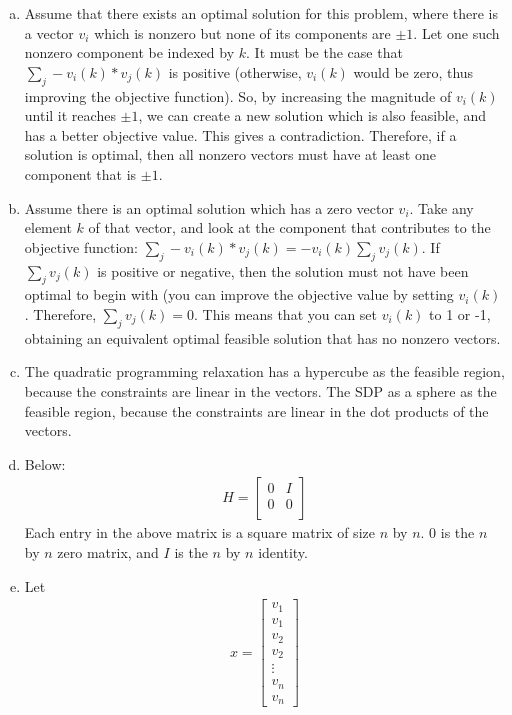 \documentclass[fleqn]{homework}
\begin{document}
\begin{problem}{3}
    \begin{enumerate}[a.]
    \item Assume that there exists an optimal solution for this problem, where
      there is a vector $v_i$ which is nonzero but none of its components are
      $\pm 1$.  Let one such nonzero component be indexed by $k$.  It must be
      the case that $\sum_{j} -v_i(k) * v_j(k)$ is positive (otherwise,
      $v_{i}(k)$ would be zero, thus improving the objective function).  So, by
      increasing the magnitude of $v_i(k)$ until it reaches $\pm 1$, we can
      create a new solution which is also feasible, and has a better objective
      value.  This gives a contradiction.  Therefore, if a solution is optimal,
      then all nonzero vectors must have at least one component that is $\pm 1$.
    \item Assume there is an optimal solution which has a zero vector $v_i$.
      Take any element $k$ of that vector, and look at the component that
      contributes to the objective function:
      $\sum_{j} - v_i(k) * v_j(k) = - v_i(k) \sum_{j} v_j(k)$.  If
      $\sum_{j} v_j(k)$ is positive or negative, then the solution must not have
      been optimal to begin with (you can improve the objective value by setting
      $v_i(k)$.  Therefore, $\sum_{j} v_j(k) = 0$.  This means that you can set
      $v_i(k)$ to 1 or -1, obtaining an equivalent optimal feasible solution
      that has no nonzero vectors.
    \item The quadratic programming relaxation has a hypercube as the feasible
      region, because the constraints are linear in the vectors.  The SDP as a
      sphere as the feasible region, because the constraints are linear in the
      dot products of the vectors.
    \item Below:
      \begin{align*}
        H = \begin{bmatrix*} 
          0 & I \\
          0 & 0 \\
        \end{bmatrix*}
      \end{align*}
      Each entry in the above matrix is a square matrix of size $n$ by $n$.  0
      is the $n$ by $n$ zero matrix, and $I$ is the $n$ by $n$ identity.
    \item Let
      \begin{align*}
        x = \begin{bmatrix*} v_1 \\ v_1 \\ v_2 \\ v_2 \\ \vdots \\ v_n \\ v_n \end{bmatrix*}
      \end{align*}


\end{enumerate}
\end{problem}
\end{document}

